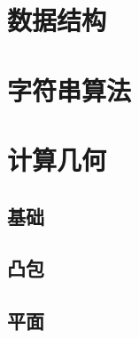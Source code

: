 \documentclass[12pt,a4paper,titlepage]{article}
\begin{document}

\section{\LARGE 数据结构}

\section{\LARGE 字符串算法}

\section{\LARGE 计算几何}
	\subsection{基础}

	\subsection{凸包}

	\subsection{平面}
\end{document}
